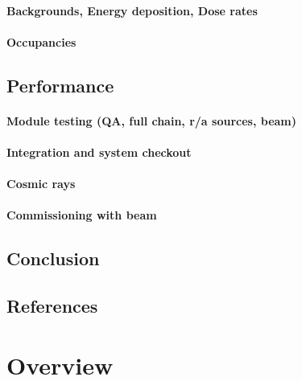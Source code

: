 \paragraph{Backgrounds, Energy deposition, Dose rates}
\paragraph{Occupancies}
\subsection{Performance}
\paragraph{Module testing (QA, full chain, r/a sources, beam)}
\paragraph{Integration and system checkout}
\paragraph{Cosmic rays}
\paragraph{Commissioning with beam}
\subsection{Conclusion}
\subsection{References}

\newpage
\section{Overview}

